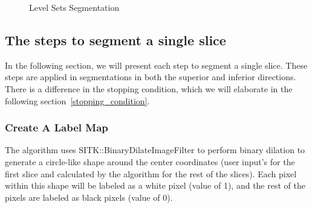 \begin{figure}[H] 
\centering
{}%
%
%
\caption[Level Sets Segmentation]{Level Sets Segmentation}
\label{LSS}
\end{figure}

\subsection{The steps to segment a single slice}
In the following section, we will present each step to segment a single slice. These steps are applied in segmentations in both the superior and inferior directions. There is a difference in the stopping condition, which we will elaborate in the following section~\ref{stopping_condition}.
\subsubsection{Create A Label Map}
The algorithm uses SITK::BinaryDilateImageFilter to perform binary dilation to generate a circle-like shape around the center coordinates (user input’s for the first slice and calculated by the algorithm for the rest of the slices). Each pixel within this shape will be labeled as a white pixel (value of 1), and the rest of the pixels are labeled as black pixels (value of 0). 

